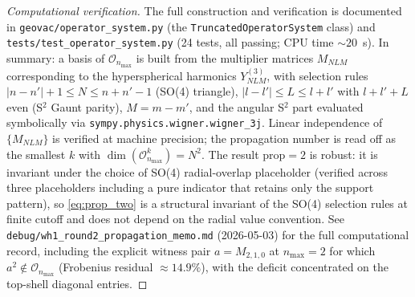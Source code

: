 \documentclass[11pt]{article}
\begin{document}
\begin{proof}[Computational verification]
The full construction and verification is documented in
\texttt{geovac/operator\_system.py} (the \texttt{TruncatedOperatorSystem}
class) and \texttt{tests/test\_operator\_system.py} (24 tests, all
passing; CPU time ${\sim}20$~s).  In summary: a basis of
$\mathcal{O}_{n_{\max}}$ is built from the multiplier matrices
$M_{NLM}$ corresponding to the hyperspherical harmonics
$Y^{(3)}_{NLM}$, with selection rules $|n - n'| + 1 \le N \le n + n' -
1$ (SO(4) triangle), $|l - l'| \le L \le l + l'$ with $l + l' + L$
even (S$^2$ Gaunt parity), $M = m - m'$, and the angular S$^2$ part
evaluated symbolically via \texttt{sympy.physics.wigner.wigner\_3j}.
Linear independence of $\{M_{NLM}\}$ is verified at machine precision;
the propagation number is read off as the smallest $k$ with
$\dim(\mathcal{O}_{n_{\max}}^k) = N^2$.  The result
$\mathrm{prop} = 2$ is robust: it is invariant under the choice of
SO(4) radial-overlap placeholder (verified across three placeholders
including a pure indicator that retains only the support pattern), so
\eqref{eq:prop_two} is a structural invariant of the SO(4) selection
rules at finite cutoff and does not depend on the radial value
convention.  See \texttt{debug/wh1\_round2\_propagation\_memo.md}
(2026-05-03) for the full computational record, including the explicit
witness pair $a = M_{2,1,0}$ at $n_{\max} = 2$ for which $a^2 \notin
\mathcal{O}_{n_{\max}}$ (Frobenius residual $\approx 14.9\%$), with
the deficit concentrated on the top-shell diagonal entries.
\end{proof}
\end{document}
